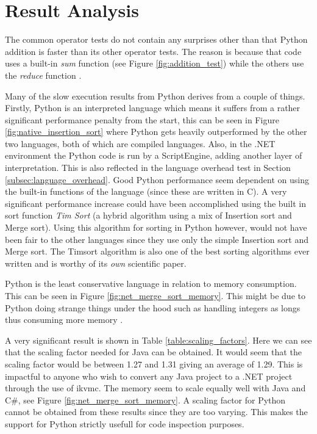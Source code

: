 \section{Result Analysis}

The common operator tests do not contain any surprises other than that Python addition is faster than its other operator tests. The reason is because that code uses a built-in \textit{sum} function \cite{PythonSum} (see Figure \ref{fig:addition_test}) while the others use the \textit{reduce} function \cite{PythonReduce}.

Many of the slow execution results from Python derives from a couple of things. Firstly, Python is an interpreted language which means it suffers from a rather significant performance penalty from the start, this can be seen in Figure \ref{fig:native_insertion_sort} where Python gets heavily outperformed by the other two languages, both of which are compiled languages. Also, in the .NET environment the Python code is run by a ScriptEngine, adding another layer of interpretation. This is also reflected in the language overhead test in Section \ref{subsec:language_overhead}. Good Python performance seem dependent on using the built-in functions of the language (since these are written in C). A very significant performance increase could have been accomplished using the built in sort function \textit{Tim Sort} \cite{PythonSort} (a hybrid algorithm using a mix of Insertion sort and Merge sort). Using this algorithm for sorting in Python however, would not have been fair to the other languages since they use only the simple Insertion sort and Merge sort. The Timsort algorithm is also one of the best sorting algorithms ever written and is worthy of its \textit{own} scientific paper.

Python is the least conservative language in relation to memory consumption. This can be seen in Figure \ref{fig:net_merge_sort_memory}. This might be due to Python doing strange things under the hood such as handling integers as longs thus consuming more memory \cite{PythonInteger}.

A very significant result is shown in Table \ref{table:scaling_factors}. Here we can see that the scaling factor needed for Java can be obtained. It would seem that the scaling factor would be between 1.27 and 1.31 giving an average of 1.29. This is impactful to anyone who wish to convert any Java project to a .NET project through the use of ikvmc. The memory seem to scale equally well with Java and C\#, see Figure \ref{fig:net_merge_sort_memory}. A scaling factor for Python cannot be obtained from these results since they are too varying. This makes the support for Python strictly usefull for code inspection purposes.
